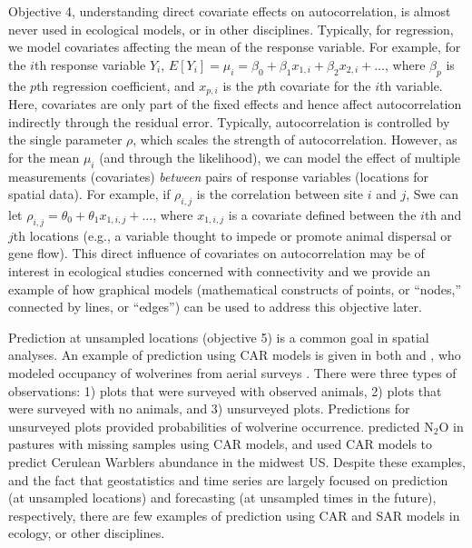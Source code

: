 \documentclass[11pt, titlepage]{article}\usepackage[]{graphicx}\usepackage[]{color}
\begin{document}
\begin{spacing}{1.9}
\begin{flushleft}
Objective 4, understanding direct covariate effects on autocorrelation, is almost never used in ecological models, or in other disciplines. Typically, for regression, we model covariates affecting the mean of the response variable. For example, for the $i$th response variable $Y_i$, $E[Y_i] = \mu_i = \beta_0 + \beta_1 x_{1,i} + \beta_2 x_{2,i} + \ldots$, where $\beta_p$ is the $p$th regression coefficient, and $x_{p,i}$ is the $p$th covariate for the $i$th variable. Here, covariates are only part of the fixed effects and hence affect autocorrelation indirectly through the residual error. Typically, autocorrelation is controlled by the single parameter $\rho$, which scales the strength of autocorrelation. However, as for the mean $\mu_i$ (and through the likelihood), we can model the effect of multiple measurements (covariates) \emph{between} pairs of response variables (locations for spatial data).  For example, if $\rho_{i,j}$ is the correlation between site $i$ and $j$, Swe can let $\rho_{i,j} = \theta_0 + \theta_1 x_{1,i,j} + \ldots$, where $x_{1,i,j}$ is a covariate defined between the $i$th and $j$th locations (e.g., a variable thought to impede or promote animal dispersal or gene flow). This direct influence of covariates on autocorrelation may be of interest in ecological studies concerned with connectivity \citep[for a landscape-genetic example, see][]{Hank:Hoot:circ:2013} and we provide an example of how graphical models (mathematical constructs of points, or ``nodes,'' connected by lines, or ``edges'') can be used to address this objective later. 

Prediction at unsampled locations (objective 5) is a common goal in spatial analyses.  An example of prediction using CAR models is given in both \citet{Mago:Ray:John:Valk:Daws:Bowm:mode:2007} and \citet{Gard:Lawl:Ver:Mago:Kell:coar:2010}, who modeled occupancy of wolverines from aerial surveys \citep[also see][]{John:Conn:Hoot:Ray:Pond:spat:2013}. There were three types of observations: 1) plots that were surveyed with observed animals, 2) plots that were surveyed with no animals, and 3) unsurveyed plots.  Predictions for unsurveyed plots provided probabilities of wolverine occurrence. \citet{Huan:Grac:Hu:Rowl:Meng:spat:2013} predicted N$_2$O in pastures with missing samples using CAR models, and \citet{Thog:Saue:Knut:hier:2004} used CAR models to predict Cerulean Warblers abundance in the midwest US. Despite these examples, and the fact that geostatistics and time series are largely focused on prediction (at unsampled locations) and forecasting (at unsampled times in the future), respectively, there are few examples of prediction using CAR and SAR models in ecology, or other disciplines.


\end{flushleft}
\end{spacing}
\end{document}

